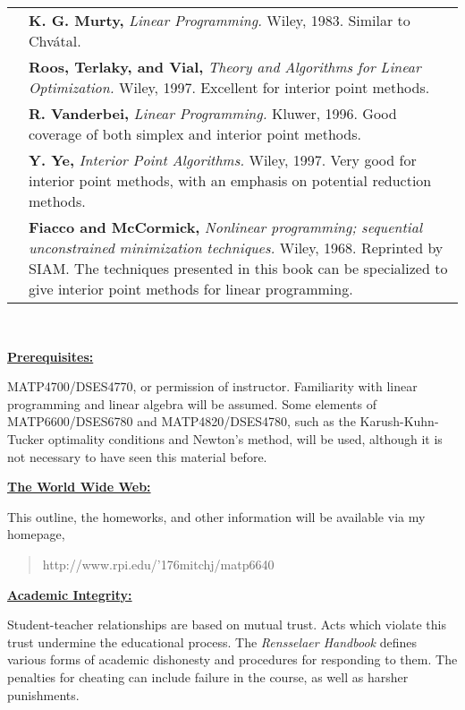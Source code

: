 \documentclass[11pt]{article}
\newcommand{\til}{\char '176}
\begin{document}
\begin{tabular}{l@{\hspace{.2in}}p{7in}}
              &   {\bf K. G. Murty,} {\em Linear Programming.} Wiley, 1983.
                    Similar to Chv\'{a}tal.  \\
              &   {\bf Roos, Terlaky, and Vial,} 
                     {\em Theory and Algorithms for Linear Optimization.}
                    Wiley, 1997.
                     Excellent for interior point methods.\\
              &   {\bf R. Vanderbei,}  {\em Linear Programming.} Kluwer, 1996.
                    Good coverage of both simplex and interior point methods. \\
              &   {\bf Y. Ye,} {\em Interior Point Algorithms.}
                    Wiley, 1997.
                    Very good for interior point methods, with an emphasis on
                    potential reduction methods.  \\
              &   {\bf Fiacco and McCormick,} {\em Nonlinear programming;
                    sequential unconstrained minimization techniques.}
                    Wiley, 1968. Reprinted by SIAM.
                    The techniques presented in this book
                    can be specialized to give interior point methods for
                    linear programming.  \\
\end{tabular}

\quad  \\

{\raggedright   {\bf \underline{Prerequisites:}}  }
MATP4700/DSES4770, or permission of instructor.
Familiarity with linear programming and linear algebra will be assumed.
Some elements of MATP6600/DSES6780 and MATP4820/DSES4780,
such as the Karush-Kuhn-Tucker
optimality conditions and Newton's
method, will be used, although it is not necessary to have seen this material
before.  \\

{\raggedright  {\bf \underline{The World Wide Web:}}  }
This outline, the homeworks, and other information
will be available via my homepage,
\begin{quote}
  http://www.rpi.edu/\til mitchj/matp6640
\end{quote}

{\raggedright   {\bf \underline{Academic Integrity:}}  }
Student-teacher relationships are based on mutual trust.
Acts which violate this trust undermine the educational process.
The {\em Rensselaer Handbook} defines various forms of academic
dishonesty and procedures for responding to them.
The penalties for cheating can include failure in the course,
as well as harsher punishments. \\
\end{document}
